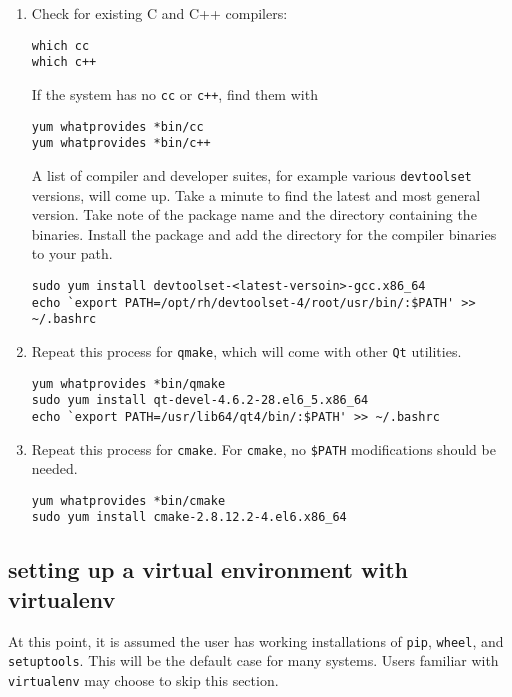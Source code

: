 \begin{enumerate}
\item 
Check for existing C and C++ compilers:
\begin{lstlisting}
which cc
which c++
\end{lstlisting}
If the system has no \verb|cc| or \verb|c++|,
find them with 
\begin{lstlisting}
yum whatprovides *bin/cc
yum whatprovides *bin/c++
\end{lstlisting}
A list of compiler and developer suites, 
for example various \verb|devtoolset| versions, will come up.
Take a minute to find
the latest and most general version.
Take note of the package name and the directory containing the binaries.
Install the package and add the directory for the compiler binaries to your path.
\begin{lstlisting}
sudo yum install devtoolset-<latest-versoin>-gcc.x86_64 
echo `export PATH=/opt/rh/devtoolset-4/root/usr/bin/:$PATH' >> ~/.bashrc
\end{lstlisting}

\item 
Repeat this process for \verb|qmake|, which will come with other \verb|Qt| utilities.
\begin{lstlisting}
yum whatprovides *bin/qmake
sudo yum install qt-devel-4.6.2-28.el6_5.x86_64 
echo `export PATH=/usr/lib64/qt4/bin/:$PATH' >> ~/.bashrc
\end{lstlisting}

\item 
Repeat this process for \verb|cmake|. 
For \verb|cmake|, no \verb|$PATH| modifications should be needed.
\begin{lstlisting}
yum whatprovides *bin/cmake
sudo yum install cmake-2.8.12.2-4.el6.x86_64 
\end{lstlisting}

\end{enumerate}


\subsection{setting up a virtual environment with virtualenv}
\label{subsec:virtualenv}

At this point, it is assumed the user has working installations of
\verb|pip|, \verb|wheel|, and \verb|setuptools|.
This will be the default case for many systems.
Users familiar with \verb|virtualenv| may choose to skip this section.


